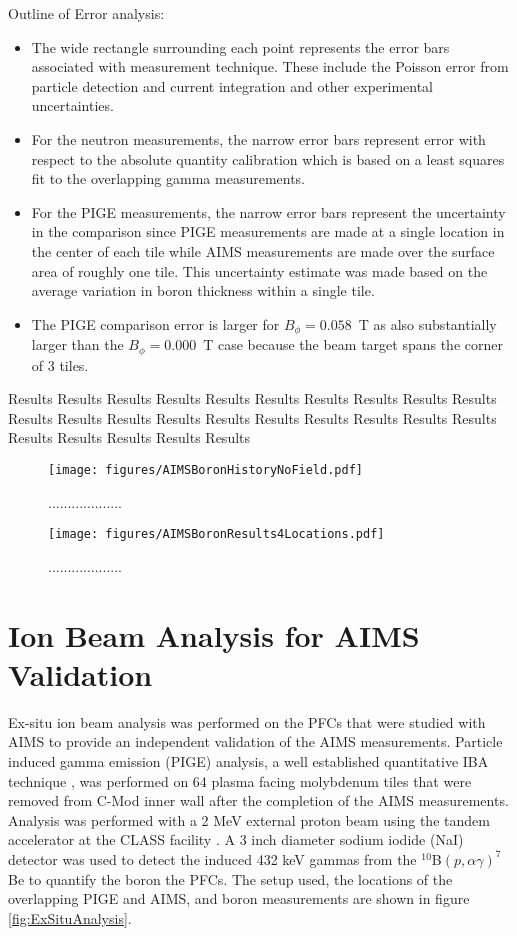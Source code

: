 \documentclass[final,3p,times,twocolumn]{elsarticle}
\begin{document}
Outline of Error analysis: 
\begin{itemize}
\item The wide rectangle surrounding each point represents the error bars associated with measurement technique.  These include the Poisson error from particle detection and current integration and other experimental uncertainties. 
\item For the neutron measurements, the narrow error bars represent error with respect to the absolute quantity calibration which is based on a least squares fit to the overlapping gamma measurements.
\item For the PIGE measurements, the narrow error bars represent the uncertainty in the comparison since PIGE measurements are made at a single location in the center of each tile while AIMS measurements are made over the surface area of roughly one tile. This uncertainty estimate was made based on the average variation in boron thickness within a single tile.  
\item The PIGE comparison error is larger for $B_\phi=0.058$~T as also substantially larger than the $B_\phi=0.000$~T case because the beam target spans the corner of 3 tiles. 
\end{itemize}



Results Results Results Results Results Results Results Results Results Results Results Results Results Results Results Results Results Results Results Results Results Results Results Results Results 



\begin{figure}[h]
 \centering
  \texttt{[image: figures/AIMSBoronHistoryNoField.pdf]}
 \caption{...................}
 \label{fig:BoronTimeHistoryB0}
\end{figure}

\begin{figure}[h]
 \centering
  \texttt{[image: figures/AIMSBoronResults4Locations.pdf]}
 \caption{...................}
 \label{fig:BoronResults4Locations}
\end{figure}

\section{Ion Beam Analysis for AIMS Validation}
\label{sec:Validation}
Ex-situ ion beam analysis was performed on the PFCs that were studied with AIMS to provide an independent validation of the AIMS measurements. Particle induced gamma emission (PIGE) analysis, a well established quantitative IBA technique \cite{HaroldsThesisPHD,XMIBA,IBA7}, was performed on 64 plasma facing molybdenum tiles that were removed from C-Mod inner wall after the completion of the AIMS measurements. Analysis was performed with a 2 MeV external proton beam using the tandem accelerator at the CLASS facility \cite{wright2011plasma}. A 3 inch diameter sodium iodide (NaI) detector was used to detect the induced 432 keV gammas from the $^\mathrm{10}$B$(p,\alpha\gamma)^\mathrm{7}$Be to quantify the boron the PFCs. The setup used, the locations of the overlapping PIGE and AIMS, and boron measurements are shown in figure \ref{fig:ExSituAnalysis}.
\end{document}
